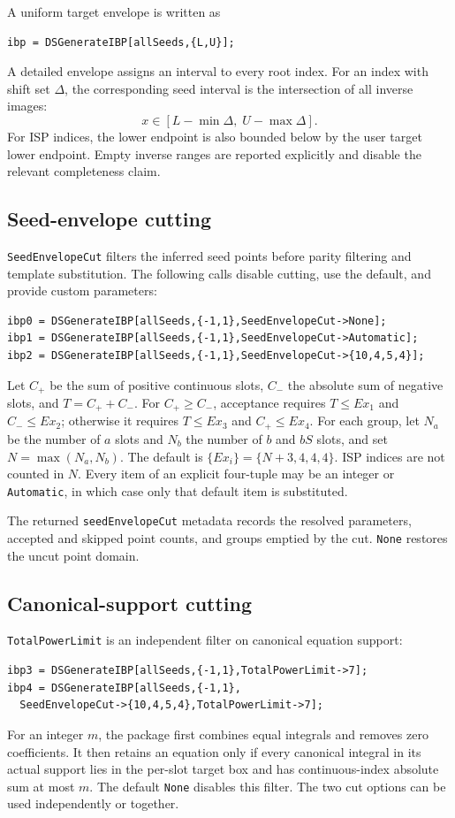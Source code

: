 ﻿\documentclass[a4paper,11pt]{article}
\begin{document}
A uniform target envelope is written as
\begin{verbatim}
ibp = DSGenerateIBP[allSeeds,{L,U}];
\end{verbatim}
A detailed envelope assigns an interval to every root index. For an index with shift set
$\Delta$, the corresponding seed interval is the intersection of all inverse images:
\begin{equation}
 x\in[L-\min\Delta,\;U-\max\Delta].
 \label{handbookSeedInverse}
\end{equation}
For ISP indices, the lower endpoint is also bounded below by the user target lower endpoint.
Empty inverse ranges are reported explicitly and disable the relevant completeness claim.

\subsection{Seed-envelope cutting}

\texttt{SeedEnvelopeCut} filters the inferred seed points before parity filtering and
template substitution. The following calls disable cutting, use the default, and provide
custom parameters:
\begin{verbatim}
ibp0 = DSGenerateIBP[allSeeds,{-1,1},SeedEnvelopeCut->None];
ibp1 = DSGenerateIBP[allSeeds,{-1,1},SeedEnvelopeCut->Automatic];
ibp2 = DSGenerateIBP[allSeeds,{-1,1},SeedEnvelopeCut->{10,4,5,4}];
\end{verbatim}
Let $C_+$ be the sum of positive continuous slots, $C_-$ the absolute sum of negative
slots, and $T=C_++C_-$. For $C_+\geq C_-$, acceptance requires $T\leq Ex_1$ and
$C_-\leq Ex_2$; otherwise it requires $T\leq Ex_3$ and $C_+\leq Ex_4$. For each group,
let $N_a$ be the number of $a$ slots and $N_b$ the number of $b$ and $bS$ slots, and set
$N=\max(N_a,N_b)$. The default is $\{Ex_i\}=\{N+3,4,4,4\}$. ISP indices are not counted
in $N$. Every item of an explicit four-tuple may
be an integer or \texttt{Automatic}, in which case only that default item is substituted.

The returned \texttt{seedEnvelopeCut} metadata records the resolved parameters, accepted
and skipped point counts, and groups emptied by the cut. \texttt{None} restores the uncut
point domain.

\subsection{Canonical-support cutting}

\texttt{TotalPowerLimit} is an independent filter on canonical equation support:
\begin{verbatim}
ibp3 = DSGenerateIBP[allSeeds,{-1,1},TotalPowerLimit->7];
ibp4 = DSGenerateIBP[allSeeds,{-1,1},
  SeedEnvelopeCut->{10,4,5,4},TotalPowerLimit->7];
\end{verbatim}
For an integer $m$, the package first combines equal integrals and removes zero coefficients.
It then retains an equation only if every canonical integral in its actual support lies in
the per-slot target box and has continuous-index absolute sum at most $m$. The default
\texttt{None} disables this filter. The two cut options can be used independently or together.
\end{document}
